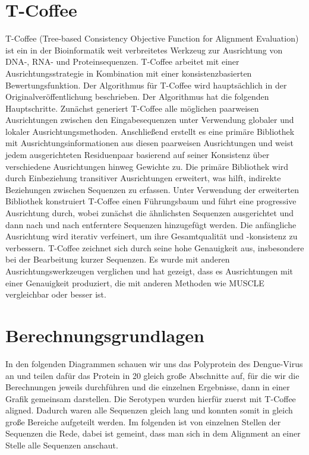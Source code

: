 \documentclass[german,version-2022-01]{uzl-thesis}
\begin{document}
\section{T-Coffee}
T-Coffee (Tree-based Consistency Objective Function for Alignment Evaluation) ist ein in der Bioinformatik weit verbreitetes Werkzeug zur Ausrichtung von DNA-, RNA- und Proteinsequenzen. T-Coffee arbeitet mit einer Ausrichtungsstrategie in Kombination mit einer konsistenzbasierten Bewertungsfunktion. Der Algorithmus f\"ur T-Coffee wird haupts\"achlich in der Originalver\"offentlichung  \cite{poirot_tcoffeeigs_2003} beschrieben. Der Algorithmus hat die folgenden Hauptschritte. Zun\"achst generiert T-Coffee alle m\"oglichen paarweisen Ausrichtungen zwischen den Eingabesequenzen unter Verwendung globaler und lokaler Ausrichtungsmethoden. Anschlie\ss{}end erstellt es eine prim\"are Bibliothek mit Ausrichtungsinformationen aus diesen paarweisen Ausrichtungen und weist jedem ausgerichteten Residuenpaar basierend auf seiner Konsistenz \"uber verschiedene Ausrichtungen hinweg Gewichte zu. Die prim\"are Bibliothek wird durch Einbeziehung transitiver Ausrichtungen erweitert, was hilft, indirekte Beziehungen zwischen Sequenzen zu erfassen. Unter Verwendung der erweiterten Bibliothek konstruiert T-Coffee einen F\"uhrungsbaum und f\"uhrt eine progressive Ausrichtung durch, wobei zun\"achst die \"ahnlichsten Sequenzen ausgerichtet und dann nach und nach entferntere Sequenzen hinzugef\"ugt werden. Die anf\"angliche Ausrichtung wird iterativ verfeinert, um ihre Gesamtqualit\"at und -konsistenz zu verbessern.
T-Coffee zeichnet sich durch seine hohe Genauigkeit aus, insbesondere bei der Bearbeitung kurzer Sequenzen. Es wurde mit anderen Ausrichtungswerkzeugen verglichen und hat gezeigt, dass es Ausrichtungen mit einer Genauigkeit produziert, die mit anderen Methoden wie MUSCLE \cite{Edgar2004MUSCLEL} vergleichbar oder besser ist.

\section{Berechnungsgrundlagen}
In den folgenden Diagrammen schauen wir uns das Polyprotein des Dengue-Virus an und teilen daf\"ur das Protein in 20 gleich gro\ss{}e Abschnitte auf, f\"ur die wir die Berechnungen jeweils durchf\"uhren und die einzelnen Ergebnisse, dann in einer Grafik gemeinsam darstellen. Die Serotypen wurden hierf\"ur zuerst mit T-Coffee aligned. Dadurch waren alle Sequenzen gleich lang und konnten somit in gleich gro\ss{}e Bereiche aufgeteilt werden. Im folgenden ist von einzelnen Stellen der Sequenzen die Rede, dabei ist gemeint, dass man sich in dem Alignment an einer Stelle alle Sequenzen anschaut. 
\end{document}

